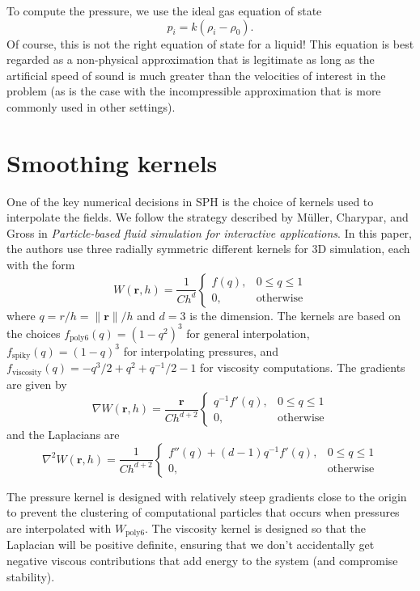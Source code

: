 \documentclass[10pt, leqno]{article} %
\newcommand{\bfr}{\mathbf{r}}
\newcommand{\Wps}{W_{\mathrm{poly6}}}
\newcommand{\fWps}{f_{\mathrm{poly6}}}
\newcommand{\fWsp}{f_{\mathrm{spiky}}}
\newcommand{\fWvi}{f_{\mathrm{viscosity}}}
\begin{document}
To compute the pressure, we use the ideal gas equation of state
\begin{equation} \label{eq-eos}
  p_i = k (\rho_i-\rho_0).
\end{equation}
Of course, this is not the right equation of state for a liquid!
This equation is best regarded as a non-physical approximation that
is legitimate as long as the artificial speed of sound is much greater
than the velocities of interest in the problem (as is the case
with the incompressible approximation that is more commonly used in other
settings).

\section{Smoothing kernels}

One of the key numerical decisions in SPH is the choice of kernels
used to interpolate the fields.  We follow the strategy described by
M\"uller, Charypar, and Gross in 
{\em Particle-based fluid simulation for interactive applications}.
In this paper, the authors use three radially symmetric different kernels for 3D
simulation, each with the form
\[
  W(\bfr, h) = \frac{1}{Ch^d}
  \begin{cases}
    f(q), & 0 \leq q \leq 1 \\
    0,    & \mbox{otherwise}
  \end{cases}
\]
where $q = r/h = \|\bfr\|/h$ and $d = 3$ is the dimension.  The kernels are
based on the choices $\fWps(q) = (1-q^2)^3$ for general interpolation,
$\fWsp(q) = (1-q)^3$ for interpolating pressures, and 
$\fWvi(q) = -q^3/2 + q^2 + q^{-1}/2 - 1$ for
viscosity computations.  The gradients are given by
\[
  \nabla W(\bfr, h) = \frac{\bfr}{Ch^{d+2}}
  \begin{cases}
    q^{-1} f'(q), & 0 \leq q \leq 1 \\
    0,           & \mbox{otherwise}
  \end{cases}
\]
and the Laplacians are
\[
  \nabla^2 W(\bfr, h) = \frac{1}{Ch^{d+2}}
  \begin{cases}
    f''(q) + (d-1) q^{-1} f'(q), & 0 \leq q \leq 1 \\
    0,                          & \mbox{otherwise}
  \end{cases}
\]

The pressure kernel is designed with relatively steep gradients close
to the origin to prevent the clustering of computational particles
that occurs when pressures are interpolated with $\Wps$.  The
viscosity kernel is designed so that the Laplacian will be positive
definite, ensuring that we don't accidentally get negative viscous
contributions that add energy to the system (and compromise
stability).
\end{document}
